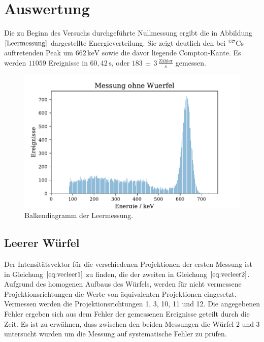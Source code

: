 \section{Auswertung}
Die zu Beginn des Versuchs durchgeführte Nullmessung ergibt die in Abbildung $\ref{Leermessung}$ dargestellte Energieverteilung. Sie zeigt deutlich den bei $^{137}$Cs auftretenden Peak um $662 \, \si{\kilo\electronvolt}$ sowie die davor liegende
Compton-Kante. Es werden $11059$ Ereignisse in $60,42 \, \si{\second}$, oder $183 \,  \pm \, 3\, \frac{\text{Zähler}}{\si{\second}}$ gemessen.
\begin{figure}[H]
  \centering
  \includegraphics{plots/leer.pdf}
  \caption{Balkendiagramm der Leermessung.}
  \label{Leermessung}
\end{figure}
\subsection{Leerer Würfel}
Der Intensitätsvektor für die verschiedenen Projektionen der ersten Messung ist in Gleichung $\ref{eq:vecleer1}$ zu finden, die der zweiten in Gleichung $\ref{eq:vecleer2}$.
Aufgrund des homogenen Aufbaus des Würfels,
werden für nicht vermessene Projektionsrichtungen die Werte von äquivalenten Projektionen eingesetzt.
Vermessen werden die Projektionsrichtungen 1, 3, 10, 11 und 12. Die angegebenen Fehler ergeben sich aus dem Fehler der gemessenen Ereignisse geteilt durch die Zeit. Es ist
zu erwähnen, dass zwischen den beiden Messungen die Würfel 2 und 3 untersucht wurden um die Messung auf systematische Fehler zu prüfen.

